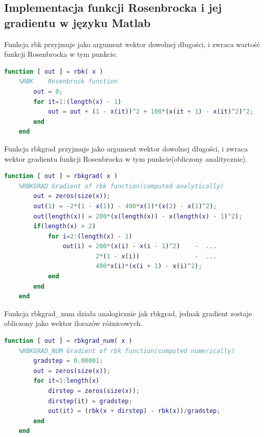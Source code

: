\documentclass[12pt]{article}
\begin{document}
\newpage

\subsection*{Implementacja funkcji Rosenbrocka i jej gradientu w języku Matlab}

Funkcja rbk przyjmuje jako argument wektor dowolnej długości, i zwraca wartość
funkcji Rosenbrocka w tym punkcie.

\begin{lstlisting}[language=MATLAB, style=mystyle]
    function [ out ] = rbk( x )
    %RBK    Rosenbrock function
        out = 0;
        for it=1:(length(x) - 1)
            out = out + (1 - x(it))^2 + 100*(x(it + 1) - x(it)^2)^2;
        end
    end
\end{lstlisting}
\vspace{1cm}

Funkcja rbkgrad przyjmuje jako argument wektor dowolnej długości, i zwraca
wektor gradientu funkcji Rosenbrocka w tym punkcie(obliczony analitycznie).

\begin{lstlisting}[language=MATLAB, style=mystyle]
    function [ out ] = rbkgrad( x )
    %RBKGRAD Gradient of rbk function(computed analytically)
        out = zeros(size(x));
        out(1) = -2*(1 - x(1)) - 400*x(1)*(x(2) - x(1)^2);
        out(length(x)) = 200*(x(length(x)) - x(length(x) - 1)^2);
        if(length(x) > 2)
            for i=2:(length(x) - 1)
                out(i) = 200*(x(i) - x(i - 1)^2)    -  ...
                         2*(1 - x(i))               -  ...
                         400*x(i)*(x(i + 1) - x(i)^2);
            end
        end
    end
\end{lstlisting}
\vspace{1cm}

Funkcja rbkgrad\_num działa analogicznie jak rbkgrad, jednak gradient zostaje
obliczony jako wektor ilorazów różnicowych.

\begin{lstlisting}[language=MATLAB, style=mystyle]
    function [ out ] = rbkgrad_num( x )
    %RBKGRAD_NUM Gradient of rbk function(computed numerically)
        gradstep = 0.00001;
        out = zeros(size(x));
        for it=1:length(x)
            dirstep = zeros(size(x));
            dirstep(it) = gradstep;
            out(it) = (rbk(x + dirstep) - rbk(x))/gradstep;
        end
    end
\end{lstlisting}

\newpage
\end{document}
